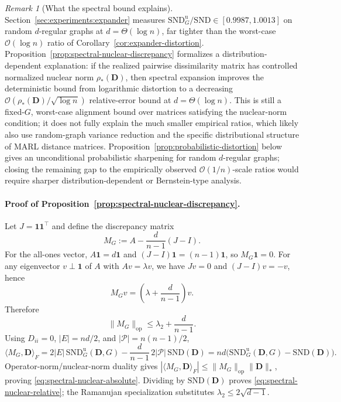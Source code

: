 \documentclass{article}
\theoremstyle{plain}
\theoremstyle{definition}
\theoremstyle{remark}
\newtheorem{remark}[theorem]{Remark}
\newcommand{\Pairs}{\mathcal{P}}         %
\newcommand{\SND}{\ensuremath{\mathrm{SND}}}
\newcommand{\SNDG}{\mathrm{SND}_{G}}
\begin{document}
\begin{remark}[What the spectral bound explains]
\label{rem:spectral-sharpening}
Section~\ref{sec:experiments:expander} measures
$\SNDG^{\mathrm{u}}/\SND\in[0.9987,1.0013]$ on random $d$-regular
graphs at $d{=}\Theta(\log n)$, far tighter than the worst-case
$\mathcal{O}(\log n)$ ratio of
Corollary~\ref{cor:expander-distortion}.
Proposition~\ref{prop:spectral-nuclear-discrepancy} formalizes a
distribution-dependent explanation: if the realized pairwise
dissimilarity matrix has controlled normalized nuclear norm
$\rho_*(\mathbf{D})$, then spectral expansion improves the deterministic
bound from logarithmic distortion to a decreasing
$\mathcal{O}(\rho_*(\mathbf{D})/\sqrt{\log n})$ relative-error bound at
$d=\Theta(\log n)$. This is still a fixed-$G$, worst-case alignment
bound over matrices satisfying the nuclear-norm condition; it does not
fully explain the much smaller empirical ratios, which likely also use
random-graph variance reduction and the specific distributional
structure of MARL distance matrices.
Proposition~\ref{prop:probabilistic-distortion} below gives an
unconditional probabilistic sharpening for random $d$-regular graphs;
closing the remaining gap to the empirically observed
$\mathcal{O}(1/n)$-scale ratios would require sharper
distribution-dependent or Bernstein-type analysis.
\end{remark}

\paragraph{Proof of Proposition~\ref{prop:spectral-nuclear-discrepancy}.}
Let $J=\mathbf{1}\mathbf{1}^{\top}$ and define the discrepancy matrix
\[
M_G:=A-\frac{d}{n-1}(J-I).
\]
For the all-ones vector, $A\mathbf{1}=d\mathbf{1}$ and
$(J-I)\mathbf{1}=(n-1)\mathbf{1}$, so $M_G\mathbf{1}=0$.
For any eigenvector $v\perp\mathbf{1}$ of $A$ with
$Av=\lambda v$, we have $Jv=0$ and $(J-I)v=-v$, hence
\[
M_G v=\left(\lambda+\frac{d}{n-1}\right)v.
\]
Therefore
\[
\|M_G\|_{\mathrm{op}}
\leq
\lambda_2+\frac{d}{n-1}.
\]
Using $D_{ii}=0$, $|E|=nd/2$, and
$|\Pairs|=n(n-1)/2$,
\[
\langle M_G,\mathbf{D}\rangle_F
=
2|E|\,\SNDG^{\mathrm{u}}(\mathbf{D},G)
-\frac{d}{n-1}\,2|\Pairs|\,\SND(\mathbf{D})
=
nd\bigl(\SNDG^{\mathrm{u}}(\mathbf{D},G)-\SND(\mathbf{D})\bigr).
\]
Operator-norm/nuclear-norm duality gives
$|\langle M_G,\mathbf{D}\rangle_F|
\leq \|M_G\|_{\mathrm{op}}\|\mathbf{D}\|_*$, proving
\eqref{eq:spectral-nuclear-absolute}. Dividing by $\SND(\mathbf{D})$
proves \eqref{eq:spectral-nuclear-relative}; the Ramanujan specialization
substitutes $\lambda_2\leq2\sqrt{d-1}$.
\end{document}
